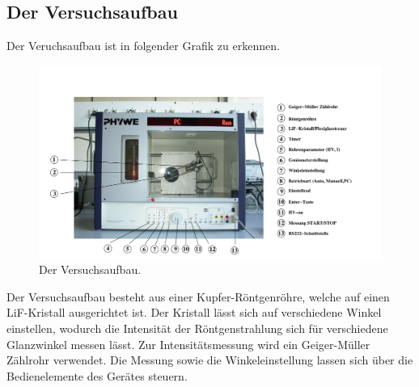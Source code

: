 \subsection{Der Versuchsaufbau}
\label{sec:Versuchsaufbau}
Der Veruchsaufbau ist in folgender Grafik zu erkennen.
\begin{figure}[H]
  \centering
  \includegraphics[scale=0.5]{"content/aufbau.png"}
  \caption{Der Versuchsaufbau.}
  \label{fig:aufbaudurchführung}
\end{figure}
\noindent
Der Versuchsaufbau besteht aus einer Kupfer-Röntgenröhre, welche auf einen LiF-Kristall
ausgerichtet ist. Der Kristall lässt sich auf verschiedene Winkel einstellen,
wodurch die Intensität der Röntgenstrahlung sich für verschiedene Glanzwinkel
messen lässt. Zur Intensitätsmessung wird ein Geiger-Müller Zählrohr verwendet.
Die Messung sowie die Winkeleinstellung lassen sich über die Bedienelemente des
Gerätes steuern. 
